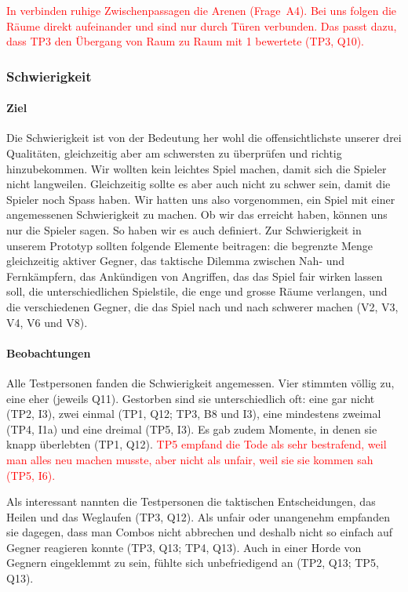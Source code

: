 \documentclass[../Main.tex]{subfiles}
\begin{document}
\textcolor{red}{In  verbinden ruhige Zwischenpassagen die Arenen (Frage~A4). Bei uns folgen die Räume direkt aufeinander und sind nur durch Türen verbunden. Das passt dazu, dass TP3 den Übergang von Raum zu Raum mit 1 bewertete (TP3, Q10).}

\subsubsection{Schwierigkeit}

\paragraph{Ziel}
Die Schwierigkeit ist von der Bedeutung her wohl die offensichtlichste unserer drei Qualitäten, gleichzeitig aber am schwersten zu überprüfen und richtig hinzubekommen. Wir wollten kein leichtes Spiel machen, damit sich die Spieler nicht langweilen. Gleichzeitig sollte es aber auch nicht zu schwer sein, damit die Spieler noch Spass haben. Wir hatten uns also vorgenommen, ein Spiel mit einer angemessenen Schwierigkeit zu machen. Ob wir das erreicht haben, können uns nur die Spieler sagen. So haben wir es auch definiert. Zur Schwierigkeit in unserem Prototyp sollten folgende Elemente beitragen: die begrenzte Menge gleichzeitig aktiver Gegner, das taktische Dilemma zwischen Nah- und Fernkämpfern, das Ankündigen von Angriffen, das das Spiel fair wirken lassen soll, die unterschiedlichen Spielstile, die enge und grosse Räume verlangen, und die verschiedenen Gegner, die das Spiel nach und nach schwerer machen (V2, V3, V4, V6 und V8).

\paragraph{Beobachtungen}
Alle Testpersonen fanden die Schwierigkeit angemessen. Vier stimmten völlig zu, eine eher (jeweils Q11). Gestorben sind sie unterschiedlich oft: eine gar nicht (TP2, I3), zwei einmal (TP1, Q12; TP3, B8 und I3), eine mindestens zweimal (TP4, I1a) und eine dreimal (TP5, I3). Es gab zudem Momente, in denen sie knapp überlebten (TP1, Q12). \textcolor{red}{TP5 empfand die Tode als sehr bestrafend, weil man alles neu machen musste, aber nicht als unfair, weil sie sie kommen sah (TP5, I6).}

Als interessant nannten die Testpersonen die taktischen Entscheidungen, das Heilen und das Weglaufen (TP3, Q12). Als unfair oder unangenehm empfanden sie dagegen, dass man Combos nicht abbrechen und deshalb nicht so einfach auf Gegner reagieren konnte (TP3, Q13; TP4, Q13). Auch in einer Horde von Gegnern eingeklemmt zu sein, fühlte sich unbefriedigend an (TP2, Q13; TP5, Q13).
\end{document}

